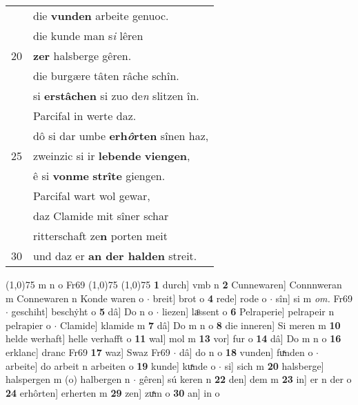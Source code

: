 \documentclass[8pt,a4paper,notitlepage]{article}
\begin{document}
\begin{table}[ht]
\begin{minipage}[t]{0.5\linewidth}
\begin{tabular}{rl}
 & die \textbf{vunden} arbeite genuoc.\\ 
 & die kunde man s\textit{i} lêren\\ 
20 & \textbf{zer} halsberge gêren.\\ 
 & die burgære tâten râche schîn.\\ 
 & si \textbf{erstâchen} si zuo de\textit{n} slitzen în.\\ 
 & Parcifal in werte daz.\\ 
 & dô si dar umbe \textbf{erh\textit{ô}rten} sînen haz,\\ 
25 & zweinzic si ir \textbf{lebende} \textbf{viengen},\\ 
 & ê si \textbf{vonme} \textbf{strîte} giengen.\\ 
 & Parcifal wart wol gewar,\\ 
 & daz Clamide mit sîner schar\\ 
 & ritterschaft ze\textbf{n} porten meit\\ 
30 & und daz er \textbf{an der halden} streit.\\ 
\end{tabular}
\scriptsize
\line(1,0){75} \newline
m n o Fr69 \newline
\line(1,0){75} \newline
\newline
\line(1,0){75} \newline
\textbf{1} durch] vmb n \textbf{2} Cunnewaren] Connnweran m Connewaren n Konde waren o  $\cdot$ breit] brot o \textbf{4} rede] rode o  $\cdot$ sîn] si m \textit{om.} Fr69  $\cdot$ geschiht] beschẏht o \textbf{5} dâ] Do n o  $\cdot$ liezen] laͦssent o \textbf{6} Pelraperie] pelrapeir n pelrapier o  $\cdot$ Clamide] klamide m \textbf{7} dâ] Do m n o \textbf{8} die inneren] Si meren m \textbf{10} helde werhaft] helle verhafft o \textbf{11} wal] mol m \textbf{13} vor] fur o \textbf{14} dâ] Do m n o \textbf{16} erklanc] dranc Fr69 \textbf{17} waz] Swaz Fr69  $\cdot$ dâ] do n o \textbf{18} vunden] fuͯnden o  $\cdot$ arbeite] do arbeit n arbeiten o \textbf{19} kunde] kuͯnde o  $\cdot$ si] sich m \textbf{20} halsberge] halspergen m (o) halbergen n  $\cdot$ gêren] sú keren n \textbf{22} den] dem m \textbf{23} in] er n der o \textbf{24} erhôrten] erherten m \textbf{29} zen] zuͯm o \textbf{30} an] in o \newline
\end{minipage}
\end{table}
\newpage
\end{document}
